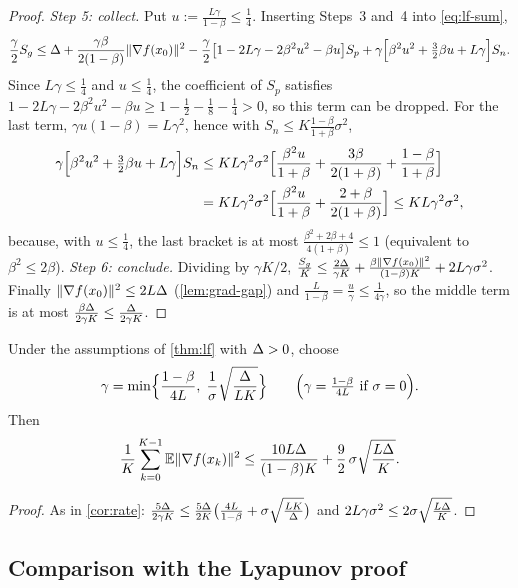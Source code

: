 \begin{proof}
\emph{Step 5: collect.} Put $u:=\frac{L\gamma}{1-\beta}\le\frac14$. Inserting Steps~3 and~4 into
\eqref{eq:lf-sum},
\[
  \frac\gamma2S_g\le\Delta+\frac{\gamma\beta}{2(1-\beta)}\lVert \nabla f(x_0)\rVert^2
  -\frac\gamma2\bigl[1-2L\gamma-2\beta^2u^2-\beta u\bigr]S_p
  +\gamma\Bigl[\beta^2u^2+\tfrac32\beta u+L\gamma\Bigr]S_n .
\]
Since $L\gamma\le\frac14$ and $u\le\frac14$, the coefficient of $S_p$ satisfies
$1-2L\gamma-2\beta^2u^2-\beta u\ge1-\frac12-\frac18-\frac14>0$, so this term can be dropped.
For the last term, $\gamma u(1-\beta)=L\gamma^2$, hence with $S_n\le K\frac{1-\beta}{1+\beta}\sigma^2$,
\begin{align*}
  \gamma\Bigl[\beta^2u^2+\tfrac32\beta u+L\gamma\Bigr]S_n
  &\le KL\gamma^2\sigma^2\Bigl[\frac{\beta^2u}{1+\beta}+\frac{3\beta}{2(1+\beta)}+\frac{1-\beta}{1+\beta}\Bigr]\\
  &=KL\gamma^2\sigma^2\Bigl[\frac{\beta^2u}{1+\beta}+\frac{2+\beta}{2(1+\beta)}\Bigr]\le KL\gamma^2\sigma^2 ,
\end{align*}
because, with $u\le\frac14$, the last bracket is at most
$\frac{\beta^2+2\beta+4}{4(1+\beta)}\le1$ (equivalent to $\beta^2\le2\beta$).
\emph{Step 6: conclude.} Dividing by $\gamma K/2$,
$\frac{S_g}{K}\le\frac{2\Delta}{\gamma K}+\frac{\beta\lVert \nabla f(x_0)\rVert^2}{(1-\beta)K}+2L\gamma\sigma^2$.
Finally $\lVert \nabla f(x_0)\rVert^2\le2L\Delta$ (\cref{lem:grad-gap}) and $\frac{L}{1-\beta}=\frac u\gamma\le\frac1{4\gamma}$,
so the middle term is at most $\frac{\beta\Delta}{2\gamma K}\le\frac{\Delta}{2\gamma K}$.
\end{proof}

\begin{corollary}\label{cor:lf-rate}
Under the assumptions of \cref{thm:lf} with $\Delta>0$, choose
\[
  \gamma=\min\Bigl\{\frac{1-\beta}{4L},\;\frac1\sigma\sqrt{\frac{\Delta}{LK}}\Bigr\}
  \qquad\Bigl(\gamma=\tfrac{1-\beta}{4L}\text{ if }\sigma=0\Bigr).
\]
Then
\[
  \frac1K\sum_{k=0}^{K-1}\mathbb{E}\lVert \nabla f(x_k)\rVert^2\le\frac{10L\Delta}{(1-\beta)K}+\frac{9}{2}\,\sigma\sqrt{\frac{L\Delta}{K}} .
\]
\end{corollary}

\begin{proof}
As in \cref{cor:rate}:
$\frac{5\Delta}{2\gamma K}\le\frac{5\Delta}{2K}\bigl(\frac{4L}{1-\beta}+\sigma\sqrt{\frac{LK}{\Delta}}\bigr)$
and $2L\gamma\sigma^2\le2\sigma\sqrt{\frac{L\Delta}{K}}$.
\end{proof}

\subsection{Comparison with the Lyapunov proof}

